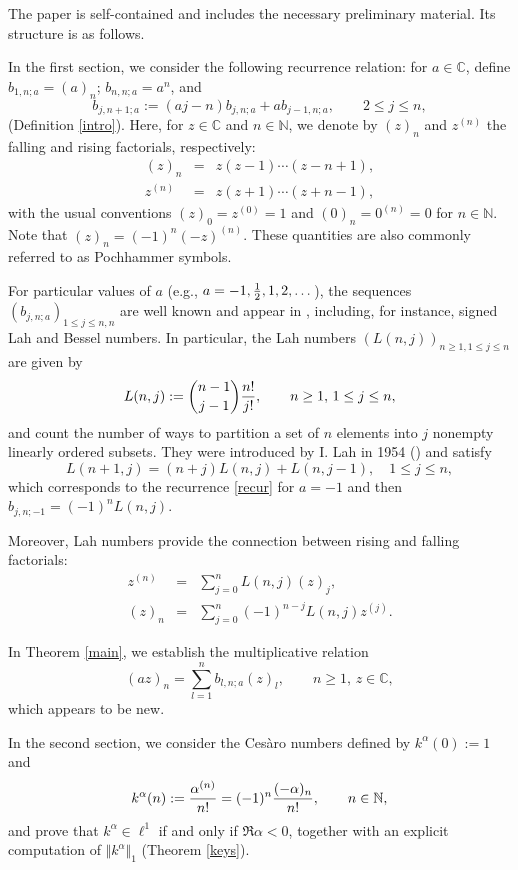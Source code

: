 \documentclass[a4paper,12pt]{amsart}
\def\N{\mathbb N}
\def\NN{\mathbb N}
\def\CC{\mathbb C}
\def\CC{\mathbb C}
\theoremstyle{definition}
\theoremstyle{remark}
\begin{document}
The paper is self-contained and includes the necessary preliminary material. Its structure is as follows.

In the first section, we consider the following recurrence relation: for $a\in \CC$, define $b_{1,n;a}= (a)_n$;   $b_{n, n;a}=a^n$, and
\begin{equation}\label{recur}
b_{j,n+1;a}:= (a j-n)b_{j,n;a}+ab_{j-1,n;a},  \qquad 2\le j\le n,
\end{equation}
(Definition \ref{intro}). Here, for $z\in \CC$ and $n\in \N$,  we denote by $(z)_n$ and $z^{(n)}$ the falling and rising factorials, respectively:
\begin{eqnarray*}
(z)_n&=&z(z-1)\cdots(z-n+1),\\
z^{(n)}&=&z(z+1)\cdots(z+n-1),
\end{eqnarray*}
with the usual conventions $(z)_0= z^{(0)}=1$ and $(0)_n=0^{(n)}=0$ for $n\in \NN$. Note that $(z)_n=(-1)^n(-z)^{(n)}$. These quantities are also commonly referred to as Pochhammer symbols.






For particular values of $a$ (e.g., $a=-1, {1\over2}, 1, 2,\dots$), the sequences $(b_{j,n;a})_{1\le j\le n,n}$ are well known and appear in \cite{sloane}, including, for instance, signed Lah and Bessel numbers. In particular, the Lah numbers $(L(n,j))_{n\ge 1, 1\le j\le n}$ are given by
$$
L(n,j):={n-1\choose j-1}{n!\over j!}, \qquad n\ge 1,\, 1\le j\le n,
$$
and count the number of ways to partition a set of $n$ elements into $j$ nonempty linearly ordered subsets. They were introduced by I. Lah in 1954 (\cite{Lah}) and satisfy
$$
L(n+1,j)=(n+j)L(n,j)+L(n,j-1), \quad 1\le j \le  n,
$$
which corresponds to the recurrence \eqref{recur} for $a=-1$ and then $b_{j,n;-1}=(-1)^nL(n,j)$.

Moreover, Lah numbers provide the connection between rising and falling factorials:
\begin{eqnarray}\label{exten}
 z^{(n)}&=&\sum_{j=0}^n L(n,j)(z)_{j},\\
 (z)_{n}&=&\sum_{j=0}^n(-1)^{n-j}L(n,j)z^{(j)}.\nonumber
\end{eqnarray}

 In Theorem \ref{main}, we establish the multiplicative relation
$$
(az)_n= \sum_{l=1}^n b_{l,n;a}(z)_l, \qquad n\ge 1, \, z\in \CC,
$$
which appears to be new.

In the second section, we consider the Cesàro numbers defined by $k^{\alpha}(0):=1$ and
$$
k^{\alpha}(n):={\alpha ^{(n)}\over n!}= (-1)^n {(-\alpha)_n\over n!}, \qquad n\in\N,
$$
and prove that $k^{\alpha}\in \ell^1$ if and only if $\Re\alpha <0$, together with an explicit computation of $\Vert k^{\alpha}\Vert_1$ (Theorem \ref{keys}).
\end{document}
